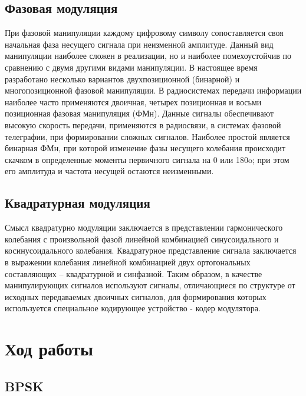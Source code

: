 \documentclass[a4paper,14pt]{extarticle}
\begin{document}
\subsection{Фазовая модуляция}
При фазовой манипуляции каждому цифровому символу сопоставляется своя начальная фаза несущего сигнала при неизменной амплитуде. Данный вид манипуляции наиболее сложен в реализации, но и наиболее помехоустойчив по сравнению с двумя другими видами манипуляции.
В настоящее время разработано несколько вариантов двухпозиционной (бинарной) и многопозиционной фазовой манипуляции. В радиосистемах передачи информации наиболее часто применяются двоичная, четырех позиционная и восьми позиционная фазовая манипуляция (ФМн). Данные сигналы обеспечивают
высокую скорость передачи, применяются в радиосвязи, в системах фазовой телеграфии, при формировании сложных сигналов.
Наиболее простой является бинарная ФМн, при которой изменение фазы несущего колебания происходит скачком в определенные моменты первичного сигнала на 0 или 180o; при этом его амплитуда и частота несущей остаются неизменными.

\subsection{Квадратурная модуляция}

Смысл квадратурно модуляции заключается в представлении гармонического колебания с произвольной фазой линейной комбинацией синусоидального и косинусоидального колебания. Квадратурное представление сигнала заключается в выражении колебания линейной комбинацией двух ортогональных составляющих – квадратурной и синфазной.
Таким образом, в качестве манипулирующих сигналов используют сигналы, отличающиеся по структуре от исходных передаваемых двоичных сигналов, для формирования которых используется специальное кодирующее устройство - кодер модулятора.

\section{Ход работы}

\subsection{BPSK}
\end{document}
